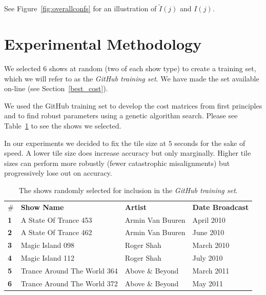 \documentclass[twocolumn]{article}
\begin{document}
See Figure~\ref{fig:overallconfs} for an illustration of $\tilde I( j )$ and $I( j )$.

\section{Experimental Methodology}\label{sec:methodology}

We selected $6$ shows at random (two of each show type)  to create a training set, which we will refer to as the \textit{GitHub training set}. We have made the set available on-line (see Section~\ref{best_cost}).

We used the GitHub training set to develop the cost matrices from first principles and to find robust parameters using a genetic algorithm search. Please see Table~\ref{table:githubset} to see the shows we selected.

In our experiments we decided to fix the tile size at $5$ seconds for the sake of speed. A lower tile size does increase accuracy but only marginally. Higher tile sizes can perform more robustly (fewer catastrophic misalignments) but progressively lose out on accuracy.

\begin{table}[t]
	
		\centering
		\caption{The shows randomly selected for inclusion in the \textit{GitHub training set}.}
		\label{table:githubset}
		
	\begin{tabular}{llll}
		\#         & \textbf{Show Name}          & \textbf{Artist}  & \textbf{Date Broadcast} \\
		\textbf{1} & A State Of Trance 453       & Armin Van Buuren & April 2010              \\
		\textbf{2} & A State Of Trance 462       & Armin Van Buuren & June 2010               \\
		\textbf{3} & Magic Island 098            & Roger Shah       & March 2010              \\
		\textbf{4} & Magic Island 112            & Roger Shah       & July 2010               \\
		\textbf{5} & Trance Around The World 364 & Above \& Beyond  & March 2011              \\
		\textbf{6} & Trance Around The World 372 & Above \& Beyond  & May 2011               
	\end{tabular}
		
\end{table}
\end{document}
